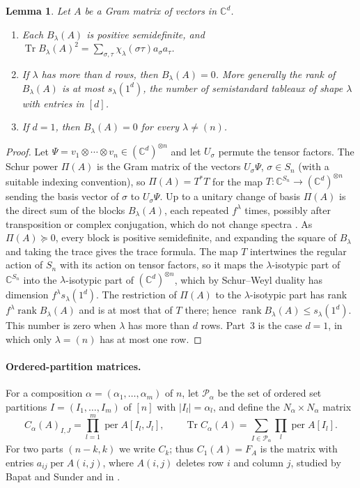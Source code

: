 \documentclass[11pt,a4paper]{article}
\newtheorem{lemma}[theorem]{Lemma}
\theoremstyle{remark}
\newcommand{\per}{\operatorname{per}}
\newcommand{\Tr}{\operatorname{Tr}}
\newcommand{\C}{\mathbb C}
\begin{document}
\begin{lemma}\label{lem:blocks}
Let $A$ be a Gram matrix of vectors in $\C^d$.
\begin{enumerate}
\item Each $B_\lambda(A)$ is positive semidefinite, and $\Tr B_\lambda(A)^2=\sum_{\sigma,\tau}\chi_\lambda(\sigma\tau)a_\sigma a_\tau$.
\item If $\lambda$ has more than $d$ rows, then $B_\lambda(A)=0$. More generally the rank of $B_\lambda(A)$ is at most $s_\lambda(1^d)$, the number of semistandard tableaux of shape $\lambda$ with entries in $[d]$.
\item If $d=1$, then $B_\lambda(A)=0$ for every $\lambda\ne(n)$.
\end{enumerate}
\end{lemma}
\begin{proof}
Let $\Psi=v_1\otimes\cdots\otimes v_n\in(\C^d)^{\otimes n}$ and let $U_\sigma$ permute the tensor factors. The Schur power $\Pi(A)$ is the Gram matrix of the vectors $U_\sigma\Psi$, $\sigma\in S_n$ (with a suitable indexing convention), so $\Pi(A)=T^*T$ for the map $T:\C^{S_n}\to(\C^d)^{\otimes n}$ sending the basis vector of $\sigma$ to $U_\sigma\Psi$. Up to a unitary change of basis $\Pi(A)$ is the direct sum of the blocks $B_\lambda(A)$, each repeated $f^\lambda$ times, possibly after transposition or complex conjugation, which do not change spectra \cite[Lemma~2.2]{Lavi}. As $\Pi(A)\succeq0$, every block is positive semidefinite, and expanding the square of $B_\lambda$ and taking the trace gives the trace formula. The map $T$ intertwines the regular action of $S_n$ with its action on tensor factors, so it maps the $\lambda$-isotypic part of $\C^{S_n}$ into the $\lambda$-isotypic part of $(\C^d)^{\otimes n}$, which by Schur--Weyl duality has dimension $f^\lambda s_\lambda(1^d)$. The restriction of $\Pi(A)$ to the $\lambda$-isotypic part has rank $f^\lambda\operatorname{rank}B_\lambda(A)$ and is at most that of $T$ there; hence $\operatorname{rank}B_\lambda(A)\le s_\lambda(1^d)$. This number is zero when $\lambda$ has more than $d$ rows. Part~3 is the case $d=1$, in which only $\lambda=(n)$ has at most one row.
\end{proof}

\paragraph{Ordered-partition matrices.} For a composition $\alpha=(\alpha_1,\dots,\alpha_m)$ of $n$, let $\mathcal P_\alpha$ be the set of ordered set partitions $I=(I_1,\dots,I_m)$ of $[n]$ with $|I_l|=\alpha_l$, and define the $N_\alpha\times N_\alpha$ matrix
\[
 C_\alpha(A)_{I,J}=\prod_{l=1}^m\per A[I_l,J_l],
 \qquad
 \Tr C_\alpha(A)=\sum_{I\in\mathcal P_\alpha}\prod_l\per A[I_l].
\]
For two parts $(n-k,k)$ we write $C_k$; thus $C_1(A)=F_A$ is the matrix with entries $a_{ij}\per A(i,j)$, where $A(i,j)$ deletes row $i$ and column $j$, studied by Bapat and Sunder \cite{BS} and in \cite{EPBS}.
\end{document}
